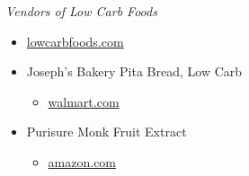 \documentclass[../recipe-collections/cooking.tex]{subfiles}
\begin{document}
\textit{Vendors of Low Carb Foods} \\
\begin{itemize}
    \item \href{https://www.lowcarbfoods.com/}{lowcarbfoods.com}
    \item Joseph's Bakery Pita Bread, Low Carb \begin{itemize}
        \item \href{https://www.walmart.com/ip/Joseph-s-Bakery-Pita-Bread-Low-Carb-8-oz/944114225}{walmart.com}
    \end{itemize}
    \item Purisure Monk Fruit Extract \begin{itemize}
        \item \href{https://www.amazon.com/gp/product/B07PMLB7SP/}{amazon.com}
    \end{itemize}
\end{itemize}
\end{document}
